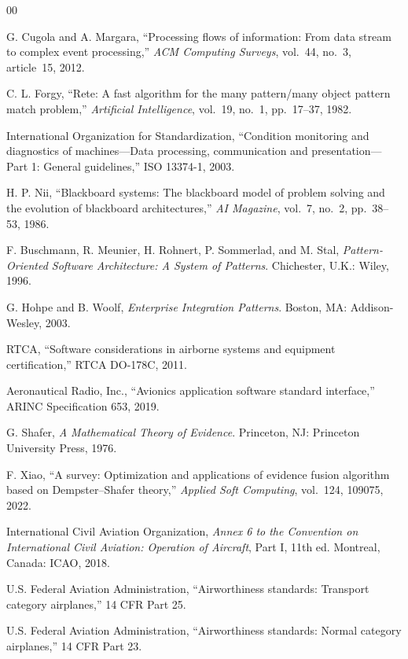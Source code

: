 \documentclass[conference]{IEEEtran}
\begin{document}
\begin{thebibliography}{00}

G. Cugola and A. Margara, ``Processing flows of information: From data stream
to complex event processing,'' \emph{ACM Computing Surveys}, vol.~44, no.~3,
article~15, 2012.

C. L. Forgy, ``Rete: A fast algorithm for the many pattern/many object pattern
match problem,'' \emph{Artificial Intelligence}, vol.~19, no.~1, pp.~17--37,
1982.

International Organization for Standardization, ``Condition monitoring and
diagnostics of machines---Data processing, communication and
presentation---Part 1: General guidelines,'' ISO 13374-1, 2003.

H. P. Nii, ``Blackboard systems: The blackboard model of problem solving and
the evolution of blackboard architectures,'' \emph{AI Magazine}, vol.~7,
no.~2, pp.~38--53, 1986.

F. Buschmann, R. Meunier, H. Rohnert, P. Sommerlad, and M. Stal,
\emph{Pattern-Oriented Software Architecture: A System of Patterns}.
Chichester, U.K.: Wiley, 1996.

G. Hohpe and B. Woolf, \emph{Enterprise Integration Patterns}. Boston, MA:
Addison-Wesley, 2003.

RTCA, ``Software considerations in airborne systems and equipment
certification,'' RTCA DO-178C, 2011.

Aeronautical Radio, Inc., ``Avionics application software standard
interface,'' ARINC Specification 653, 2019.

G. Shafer, \emph{A Mathematical Theory of Evidence}. Princeton, NJ: Princeton
University Press, 1976.

F. Xiao, ``A survey: Optimization and applications of evidence fusion
algorithm based on Dempster--Shafer theory,'' \emph{Applied Soft Computing},
vol.~124, 109075, 2022.

International Civil Aviation Organization, \emph{Annex 6 to the Convention on
International Civil Aviation: Operation of Aircraft}, Part I, 11th ed.
Montreal, Canada: ICAO, 2018.

U.S. Federal Aviation Administration, ``Airworthiness standards: Transport
category airplanes,'' 14 CFR Part 25.

U.S. Federal Aviation Administration, ``Airworthiness standards: Normal
category airplanes,'' 14 CFR Part 23.


\end{thebibliography}
\end{document}
